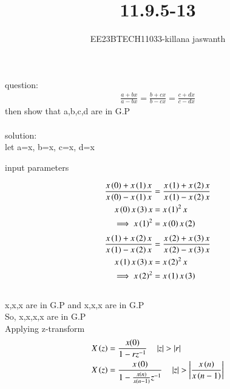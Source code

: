 \documentclass[journal,12pt,twocolumn]{IEEEtran}
\theoremstyle{remark}
\begin{document}

\vspace{3cm}

\title{11.9.5-13}
\author{EE23BTECH11033-killana jaswanth}
\maketitle
\newpage

\bigskip

\renewcommand{\thefigure}{\theenumi}
\renewcommand{\thetable}{\theenumi}
question:\begin{align}
\frac{a+bx}{a-bx}=\frac{b+cx}{b-cx}=\frac{c+dx}{c-dx}
\end{align}
then show that a,b,c,d are in G.P\\\\
solution:\\
let a=x, b=x, c=x, d=x
\\\begin{table}[!ht]
 \centering
  
   \caption{input parameters}
   \label{tab:11.9.5.13}
   \end{table}
\begin{align}
\frac{x\left(0\right)+x\left(1\right)x}{x\left(0\right)-x\left(1\right)x}&=\frac{x\left(1\right)+x\left(2\right)x}{x\left(1\right)-x\left(2\right)x}\\
x\left(0\right)x\left(3\right)x&=x\left(1\right)^2x\\
\implies x\left(1\right)^2&=x\left(0\right)x\left(2\right)
\end{align}
\begin{align}
\frac{x\left(1\right)+x\left(2\right)x}{x\left(1\right)-x\left(2\right)x}&=\frac{x\left(2\right)+x\left(3\right)x}{x\left(2\right)-x\left(3\right)x}\\
x\left(1\right)x\left(3\right)x&=x\left(2\right)^2x\\
\implies x\left(2\right)^2&=x\left(1\right)x\left(3\right)
\end{align}\\
x,x,x are in G.P and x,x,x are in G.P\\
So, x,x,x,x are in G.P\\
Applying z-transform\\
\begin{align}
X\left(z\right)&=\frac{x(0)}{1-rz^{-1}} \quad \left\vert z\right\vert>\left\vert r\right\vert\\
X\left(z\right)&=\frac{x\left(0\right)}{1-\frac{x\left(n\right)}{x\left(n-1\right)}z^{-1}}\quad \left\vert z\right\vert>\left\vert\frac{x\left(n\right)}{x\left(n-1\right)}\right\vert
\end{align}
\end{document}

